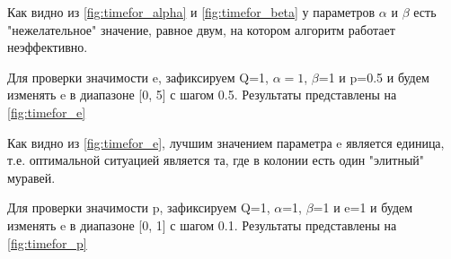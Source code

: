 Как видно из \ref{fig:timefor_alpha} и \ref{fig:timefor_beta} у параметров $\alpha$ и $\beta$ есть "нежелательное" значение, равное двум, на котором алгоритм работает неэффективно.

Для проверки значимости e, зафиксируем Q=1, $\alpha=1$, $\beta$=1 и p=0.5 и будем изменять e в диапазоне [0, 5] с шагом 0.5. Результаты представлены на \ref{fig:timefor_e}

\begin{figure}[ht!]
\end{figure}

Как видно из \ref{fig:timefor_e}, лучшим значением параметра e является единица, т.е. оптимальной ситуацией является та, где в колонии есть один "элитный" муравей.

Для проверки значимости p, зафиксируем Q=1, $\alpha$=1, $\beta$=1 и e=1 и будем изменять e в диапазоне [0, 1] с шагом 0.1. Результаты представлены на \ref{fig:timefor_p}

